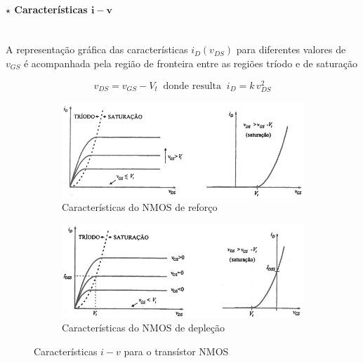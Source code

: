
\renewcommand*{\thefootnote}{\fnsymbol{footnote}}
\renewcommand*{\thefootnote}{\arabic{footnote}}
\paragraph[3.2.1.1 Características i-v]{$\pmb{\star}$ Características $\mathbf{i-v}$}\mbox{}\\[4pt]
A representação gráfica das características $i_D(v_{DS})$ para diferentes valores de $v_{GS}$ é acompanhada pela região de fronteira entre as regiões tríodo e de saturação

\vspace{-0.75em}
$$
    v_{DS} = v_{GS} - V_t\;\; \text{donde resulta}\;\; i_D = k\, v^2_{DS}
$$

\vspace{-0.75em}
\begin{figure}[H]
    \begin{subfigure}[b]{0.5\linewidth}
        \centering
        \includegraphics[width = 0.95\linewidth]{img/3/MOSFET/i-v-enhancement.png}
        \caption{Características do NMOS de reforço}
        \label{fig:NMOS-i-v-enhancement}
    \end{subfigure}
    \begin{subfigure}[b]{0.5\linewidth}
        \centering
        \includegraphics[width = 0.95\linewidth]{img/3/MOSFET/i-v-depletion.png}
        \caption{Características do NMOS de depleção}
        \label{fig:NMOS-i-v-depletion}
    \end{subfigure}%
    \caption{Características $i-v$ para o transístor NMOS}
    \label{fig:NMOS-i-v}
\end{figure}

